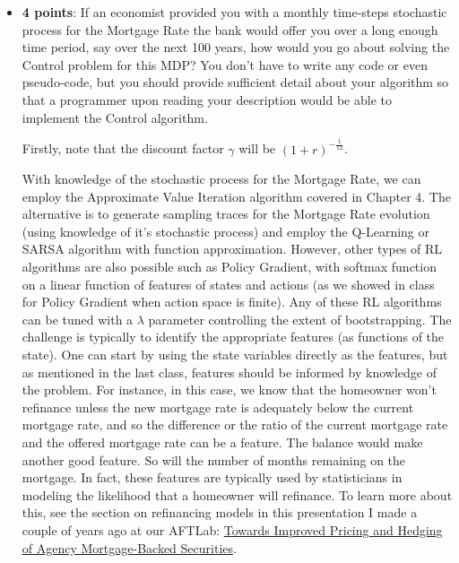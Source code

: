 \documentclass[12pt]{exam}
\begin{document}
\begin{questions}
\begin{itemize}
\begin{solution}
\end{solution}


\item {\bf 4 points}: If an economist provided you with a monthly time-steps stochastic process for the Mortgage Rate the bank would offer you over a long enough time period, say over the next 100 years, how would you go about solving the Control problem for this MDP? You don't have to write any code or even pseudo-code, but you should provide sufficient detail about your algorithm so that a programmer upon reading your description would be able to implement the Control algorithm.

\begin{solution}
Firstly, note that the discount factor $\gamma$ will be $(1 + r)^{-\frac 1 {12}}$.

With knowledge of the stochastic process for the Mortgage Rate, we can employ the Approximate Value Iteration algorithm covered in Chapter 4. The alternative is to generate sampling traces for the Mortgage Rate evolution (using knowledge of it's stochastic process) and employ the Q-Learning or SARSA algorithm with function approximation. However, other types of RL algorithms are also possible such as Policy Gradient, with softmax function on a linear function of features of states and actions (as we showed in class for Policy Gradient when action space is finite). Any of these RL algorithms can be tuned with a $\lambda$ parameter controlling the extent of bootstrapping. The challenge is typically to identify the appropriate features (as functions of the state). One can start by using the state variables directly as the features, but as mentioned in the last class, features should be informed by knowledge of the problem. For instance, in this case, we know that the homeowner won't refinance unless the new mortgage rate is adequately below the current mortgage rate, and so the difference or the ratio of the current mortgage rate and the offered mortgage rate can be a feature. The balance would make another good feature. So will the number of months remaining on the mortgage. In fact, these features are typically used by statisticians in modeling the likelihood that a homeowner will refinance. To learn more about this, see the section on refinancing models in this presentation I made a couple of years ago at our AFTLab: \href{https://github.com/coverdrive/technical-documents/blob/master/finance/AFTLab.pdf}{Towards Improved Pricing and Hedging of Agency Mortgage-Backed Securities}.


\end{solution}

\end{itemize}

\end{questions}
\end{document}
